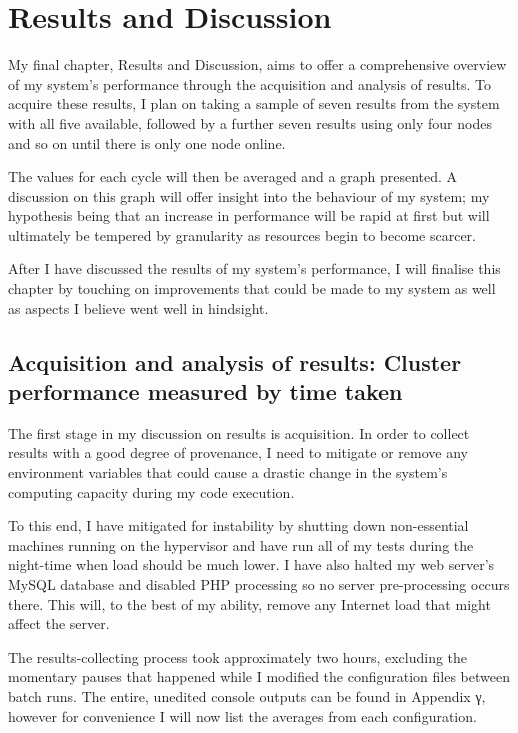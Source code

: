 \cleardoublepage
{}
\chapter{Results and Discussion}
My final chapter, Results and Discussion, aims to offer a comprehensive overview of my system's performance through the acquisition and analysis of results. To acquire these results, I plan on taking a sample of seven results from the system with all five available, followed by a further seven results using only four nodes and so on until there is only one node online.

The values for each cycle will then be averaged and a graph presented. A discussion on this graph will offer insight into the behaviour of my system; my hypothesis being that an increase in performance will be rapid at first but will ultimately be tempered by granularity as resources begin to become scarcer.

After I have discussed the results of my system's performance, I will finalise this chapter by touching on improvements that could be made to my system as well as aspects I believe went well in hindsight.

\section{Acquisition and analysis of results: Cluster performance measured by time taken}
The first stage in my discussion on results is acquisition. In order to collect results with a good degree of provenance, I need to mitigate or remove any environment variables that could cause a drastic change in the system's computing capacity during my code execution.

To this end, I have mitigated for instability by shutting down non-essential machines running on the hypervisor and have run all of my tests during the night-time when load should be much lower. I have also halted my web server's MySQL database and disabled PHP processing so no server pre-processing occurs there. This will, to the best of my ability, remove any Internet load that might affect the server.

\textbf{}

The results-collecting process took approximately two hours, excluding the momentary pauses that happened while I modified the configuration files between batch runs. The entire, unedited console outputs can be found in Appendix γ, however for convenience I will now list the averages from each configuration.

